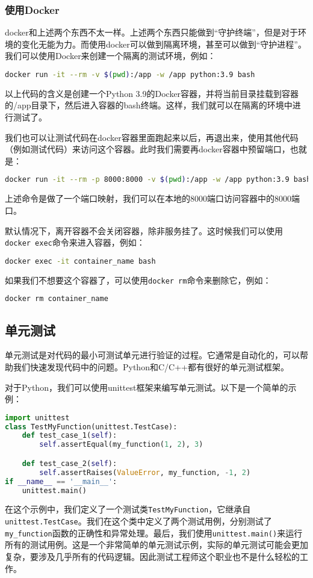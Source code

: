 \documentclass[../main.tex]{subfiles}
\begin{document}
\subsubsection{使用Docker}

docker和上述两个东西不太一样。上述两个东西只能做到“守护终端”，但是对于环境的变化无能为力。而使用docker可以做到隔离环境，甚至可以做到“守护进程”。我们可以使用Docker来创建一个隔离的测试环境，例如：
\begin{lstlisting}[language=bash]
    docker run -it --rm -v $(pwd):/app -w /app python:3.9 bash
\end{lstlisting}

以上代码的含义是创建一个Python 3.9的Docker容器，并将当前目录挂载到容器的/app目录下，然后进入容器的bash终端。这样，我们就可以在隔离的环境中进行测试了。

我们也可以让测试代码在docker容器里面跑起来以后，再退出来，使用其他代码（例如测试代码）来访问这个容器。此时我们需要再docker容器中预留端口，也就是：
\begin{lstlisting}[language=bash]
    docker run -it --rm -p 8000:8000 -v $(pwd):/app -w /app python:3.9 bash
\end{lstlisting}
上述命令是做了一个端口映射，我们可以在本地的8000端口访问容器中的8000端口。

默认情况下，离开容器不会关闭容器，除非服务挂了。这时候我们可以使用\texttt{docker exec}命令来进入容器，例如：
\begin{lstlisting}[language=bash]
    docker exec -it container_name bash
\end{lstlisting}

如果我们不想要这个容器了，可以使用\texttt{docker rm}命令来删除它，例如：
\begin{lstlisting}[language=bash]
    docker rm container_name
\end{lstlisting}

\subsection{单元测试}

单元测试是对代码的最小可测试单元进行验证的过程。它通常是自动化的，可以帮助我们快速发现代码中的问题。Python和C/C++都有很好的单元测试框架。

对于Python，我们可以使用unittest框架来编写单元测试。以下是一个简单的示例：
\begin{lstlisting}[language=python]
import unittest
class TestMyFunction(unittest.TestCase):
    def test_case_1(self):
        self.assertEqual(my_function(1, 2), 3)

    def test_case_2(self):
        self.assertRaises(ValueError, my_function, -1, 2)
if __name__ == '__main__':
    unittest.main()
\end{lstlisting}
在这个示例中，我们定义了一个测试类\texttt{TestMyFunction}，它继承自\texttt{unittest.TestCase}。我们在这个类中定义了两个测试用例，分别测试了\texttt{my\_function}函数的正确性和异常处理。最后，我们使用\texttt{unittest.main()}来运行所有的测试用例。这是一个非常简单的单元测试示例，实际的单元测试可能会更加复杂，要涉及几乎所有的代码逻辑。因此测试工程师这个职业也不是什么轻松的工作。
\end{document}
